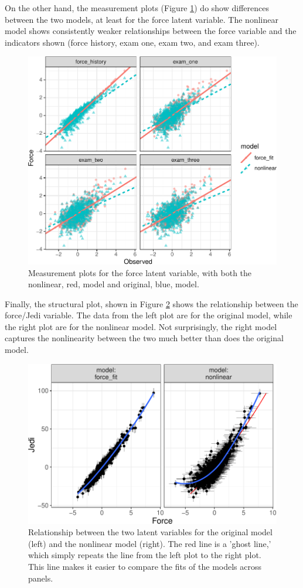 \documentclass[
  english,
  man]{apa6}
\begin{document}
On the other hand, the measurement plots (Figure \ref{fig:measnl}) do show differences between the two models, at least for the force latent variable. The nonlinear model shows consistently weaker relationships between the force variable and the indicators shown (force history, exam one, exam two, and exam three).

\begin{figure}

{\centering \includegraphics[width=0.7\linewidth]{flexplavaan_draft_files/figure-latex/measnl-1} 

}

\caption{Measurement plots for the force latent variable, with both the nonlinear, red, model and original, blue, model.}\label{fig:measnl}
\end{figure}

Finally, the structural plot, shown in Figure \ref{fig:structureNonlin} shows the relationship between the force/Jedi variable. The data from the left plot are for the original model, while the right plot are for the nonlinear model. Not surprisingly, the right model captures the nonlinearity between the two much better than does the original model.

\begin{figure}

{\centering \includegraphics[width=0.6\linewidth]{flexplavaan_draft_files/figure-latex/structureNonlin-1} 

}

\caption{Relationship between the two latent variables for the original model (left) and the nonlinear model (right). The red line is a 'ghost line,' which simply repeats the line from the left plot to the right plot. This line makes it easier to compare the fits of the models across panels.}\label{fig:structureNonlin}
\end{figure}
\end{document}
